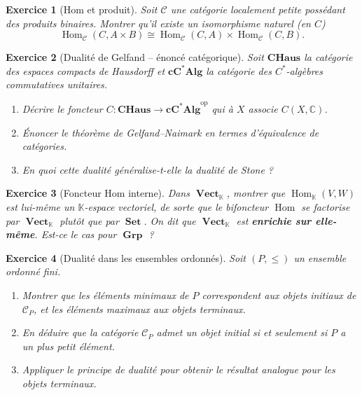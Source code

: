 \documentclass[a4paper,12pt]{book}
\DeclareMathOperator{\Hom}{Hom}
\DeclareMathOperator{\Set}{\mathbf{Set}}
\DeclareMathOperator{\Grp}{\mathbf{Grp}}
\DeclareMathOperator{\Vect}{\mathbf{Vect}}
\newcommand{\op}{\mathrm{op}}
\newcommand{\C}{\mathbb{C}}
\newcommand{\K}{\mathbb{K}}
\newtheorem{exercice}{Exercice}[chapter]
\begin{document}
\begin{exercice}[Hom et produit]\label{exo:hom-produit}
Soit $\mathcal{C}$ une catégorie localement petite possédant des produits binaires. Montrer qu'il existe un isomorphisme naturel (en $C$)
\[
  \Hom_\mathcal{C}(C, A \times B) \cong \Hom_\mathcal{C}(C, A) \times \Hom_\mathcal{C}(C, B).
\]
\end{exercice}

\begin{exercice}[Dualité de Gelfand -- énoncé catégorique]\label{exo:gelfand}
Soit $\mathbf{CHaus}$ la catégorie des espaces compacts de Hausdorff et $\mathbf{cC^*Alg}$ la catégorie des $C^*$-algèbres commutatives unitaires.
\begin{enumerate}[label=(\alph*)]
  \item Décrire le foncteur $C : \mathbf{CHaus} \to \mathbf{cC^*Alg}^{\op}$ qui à $X$ associe $C(X, \C)$.
  \item Énoncer le théorème de Gelfand--Naimark en termes d'équivalence de catégories.
  \item En quoi cette dualité généralise-t-elle la dualité de Stone ?
\end{enumerate}
\end{exercice}

\begin{exercice}[Foncteur Hom interne]\label{exo:hom-interne}
Dans $\Vect_\K$, montrer que $\Hom_\K(V, W)$ est lui-même un $\K$-espace vectoriel, de sorte que le bifoncteur $\Hom$ se factorise par $\Vect_\K$ plutôt que par $\Set$. On dit que $\Vect_\K$ est \textbf{enrichie sur elle-même}. Est-ce le cas pour $\Grp$ ?
\end{exercice}

\begin{exercice}[Dualité dans les ensembles ordonnés]\label{exo:dual-poset}
Soit $(P, \leq)$ un ensemble ordonné fini.
\begin{enumerate}[label=(\alph*)]
  \item Montrer que les éléments minimaux de $P$ correspondent aux objets initiaux de $\mathcal{C}_P$, et les éléments maximaux aux objets terminaux.
  \item En déduire que la catégorie $\mathcal{C}_P$ admet un objet initial si et seulement si $P$ a un plus petit élément.
  \item Appliquer le principe de dualité pour obtenir le résultat analogue pour les objets terminaux.
\end{enumerate}
\end{exercice}
\end{document}
